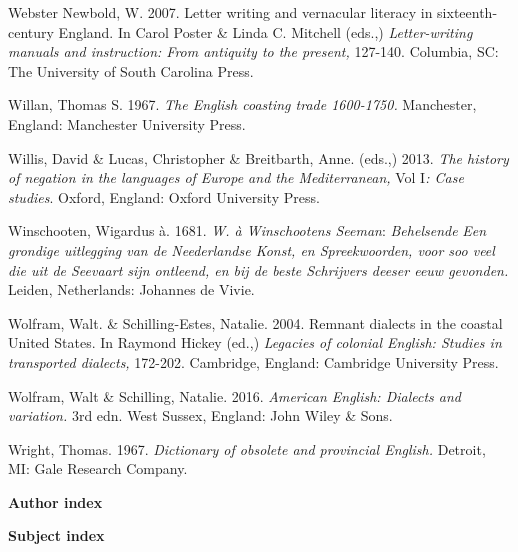\begin{styleStandard}
Webster Newbold, W. 2007. Letter writing and vernacular literacy in sixteenth-century England. In Carol Poster \& Linda C. Mitchell (eds.,) \textit{Letter-writing manuals and instruction: From antiquity to the present, }127-140. Columbia, SC: The University of South Carolina Press. 
\end{styleStandard}


\begin{styleStandard}
Willan, Thomas S. 1967. \textit{The English coasting trade 1600-1750. }Manchester, England: Manchester University Press.
\end{styleStandard}


\begin{styleStandard}
Willis, David \& Lucas, Christopher \& Breitbarth, Anne. (eds.,) 2013. \textit{The history of negation in the languages of Europe and the Mediterranean, }Vol I\textit{: Case studies}. Oxford, England: Oxford University Press. 
\end{styleStandard}


\begin{styleStandard}
Winschooten, Wigardus à. 1681. \textit{W. à Winschootens Seeman}: \textit{Behelsende}\textit{ Een grondige uitlegging van de Neederlandse Konst, en Spreekwoorden, voor soo veel die uit de Seevaart sijn ontleend, en bij de beste Schrijvers deeser eeuw gevonden}\textit{. }Leiden, Netherlands: Johannes de Vivie. 
\end{styleStandard}


\begin{styleStandard}
Wolfram, Walt. \& Schilling-Estes, Natalie. 2004. Remnant dialects in the coastal United States. In Raymond Hickey (ed.,) \textit{Legacies of colonial English: Studies in transported dialects, }172-202. Cambridge, England: Cambridge University Press.
\end{styleStandard}


\begin{styleStandard}
Wolfram, Walt \& Schilling, Natalie. 2016. \textit{American English: Dialects and variation.} 3rd edn. West Sussex, England: John Wiley \& Sons.
\end{styleStandard}


\begin{styleStandard}
Wright, Thomas. 1967. \textit{Dictionary of obsolete and provincial English.} Detroit, MI: Gale Research Company. 
\end{styleStandard}


\clearpage\begin{styleStandard}
\textbf{Author index}
\end{styleStandard}


\clearpage\begin{styleStandard}
\textbf{Subject index}
\end{styleStandard}


